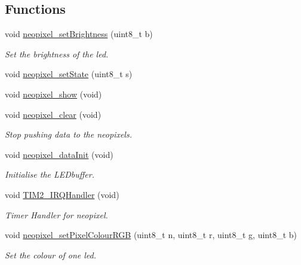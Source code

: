 \subsection*{Functions}
\begin{DoxyCompactItemize}
\item 
void \hyperlink{group___neo_pixel___state_gae027558106eef5c81996294f4561fecb}{neopixel\+\_\+set\+Brightness} (uint8\+\_\+t b)
\begin{DoxyCompactList}\small\item\em Set the brightness of the led. \end{DoxyCompactList}\item 
void \hyperlink{group___neo_pixel___state_gada44b0356745943702c92d394760cd3e}{neopixel\+\_\+set\+State} (uint8\+\_\+t s)
\item 
void \hyperlink{group___neo_pixel___state_gadb692027c25b23852a28f2ca43dc2399}{neopixel\+\_\+show} (void)
\item 
void \hyperlink{group___neo_pixel___state_ga8e3cfef785ce221672f825f8785c25b8}{neopixel\+\_\+clear} (void)
\begin{DoxyCompactList}\small\item\em Stop pushing data to the neopixels. \end{DoxyCompactList}\item 
void \hyperlink{group___neo_pixel___state_ga79e34feddcfb2c45ae218166c84bdff4}{neopixel\+\_\+data\+Init} (void)
\begin{DoxyCompactList}\small\item\em Initialise the L\+E\+Dbuffer. \end{DoxyCompactList}\item 
void \hyperlink{group___neo_pixel___state_ga38ad4725462bdc5e86c4ead4f04b9fc2}{T\+I\+M2\+\_\+\+I\+R\+Q\+Handler} (void)
\begin{DoxyCompactList}\small\item\em Timer Handler for neopixel. \end{DoxyCompactList}\item 
void \hyperlink{group___neo_pixel___state_ga63c196a71ffb007411929e41ba5df41d}{neopixel\+\_\+set\+Pixel\+Colour\+R\+GB} (uint8\+\_\+t n, uint8\+\_\+t r, uint8\+\_\+t g, uint8\+\_\+t b)
\begin{DoxyCompactList}\small\item\em Set the colour of one led. \end{DoxyCompactList}\end{DoxyCompactItemize}


